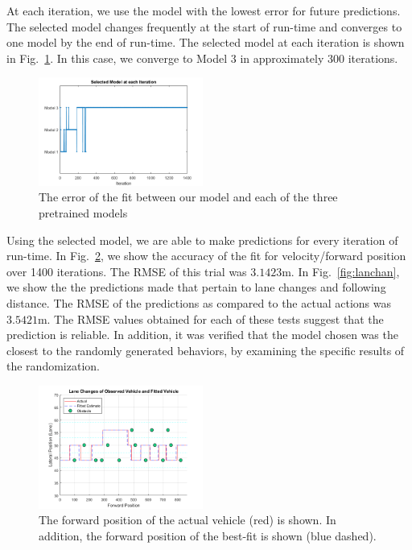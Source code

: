 \documentclass[letterpaper, 10 pt, conference]{ieeeconf}  %
\begin{document}
At each iteration, we use the model with the lowest error for future predictions. The selected model changes frequently at the start of run-time and converges to one model by the end of run-time. The selected model at each iteration is shown in Fig.~\ref{fig:select}. In this case, we converge to Model $3$ in approximately 300 iterations.

\begin{figure}[ht]
    \includegraphics[width=0.48\textwidth]{fig/modelselect.png}
    \caption{The error of the fit between our model and each of the three pretrained models} \label{fig:select}
\end{figure}

Using the selected model, we are able to make predictions for every iteration of run-time. In Fig.~\ref{fig:fwd}, we show the accuracy of the fit for velocity/forward position over 1400 iterations. The RMSE of this trial was $3.1423$m. In Fig.~\ref{fig:lanchan}, we show the the predictions made that pertain to lane changes and following distance. The RMSE of the predictions as compared to the actual actions was $3.5421$m. The RMSE values obtained for each of these tests suggest that the prediction is reliable. In addition, it was verified that the model chosen was the closest to the randomly generated behaviors, by examining the specific results of the randomization.


\begin{figure}[ht]
    \includegraphics[width=0.48\textwidth]{fig/fit2.png}
    \caption{The forward position of the actual vehicle (red) is shown. In addition, the forward position of the best-fit is shown (blue dashed).} \label{fig:fwd}
\end{figure}
\end{document}
